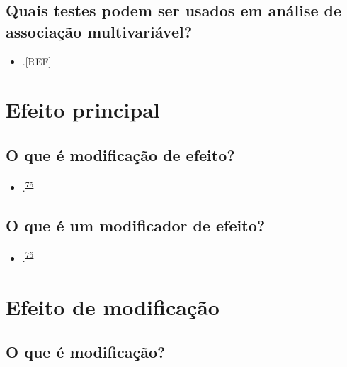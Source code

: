 \documentclass[
]{book}
\providecommand{\tightlist}{%
  \setlength{\itemsep}{0pt}\setlength{\parskip}{0pt}}
\begin{document}
\hypertarget{quais-testes-podem-ser-usados-em-anuxe1lise-de-associauxe7uxe3o-multivariuxe1vel}{%
\subsection{Quais testes podem ser usados em análise de associação multivariável?}\label{quais-testes-podem-ser-usados-em-anuxe1lise-de-associauxe7uxe3o-multivariuxe1vel}}

\begin{itemize}
\tightlist
\item
  .{[}REF{]}
\end{itemize}

\hypertarget{efeito-principal}{%
\section{Efeito principal}\label{efeito-principal}}

\hypertarget{o-que-uxe9-modificauxe7uxe3o-de-efeito}{%
\subsection{O que é modificação de efeito?}\label{o-que-uxe9-modificauxe7uxe3o-de-efeito}}

\begin{itemize}
\tightlist
\item
  .\textsuperscript{\protect\hyperlink{ref-Bours2023}{75}}
\end{itemize}

\hypertarget{o-que-uxe9-um-modificador-de-efeito}{%
\subsection{O que é um modificador de efeito?}\label{o-que-uxe9-um-modificador-de-efeito}}

\begin{itemize}
\tightlist
\item
  .\textsuperscript{\protect\hyperlink{ref-Bours2023}{75}}
\end{itemize}

\hypertarget{modificacao}{%
\section{Efeito de modificação}\label{modificacao}}

\hypertarget{o-que-uxe9-modificauxe7uxe3o}{%
\subsection{O que é modificação?}\label{o-que-uxe9-modificauxe7uxe3o}}
\end{document}
